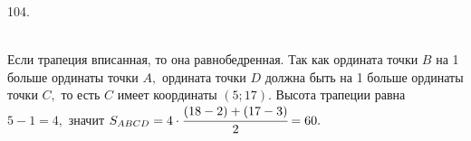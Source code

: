 104. \begin{figure}[ht!]
\end{figure}\\
Если трапеция вписанная, то она равнобедренная. Так как ордината точки $B$ на 1 больше ординаты точки $A,$ ордината точки $D$ должна быть на 1 больше ординаты точки $C,$ то есть $C$ имеет координаты $(5;17).$ Высота трапеции равна $5-1=4,$ значит $S_{ABCD}=4\cdot\cfrac{(18-2)+(17-3)}{2}=60.$\\
